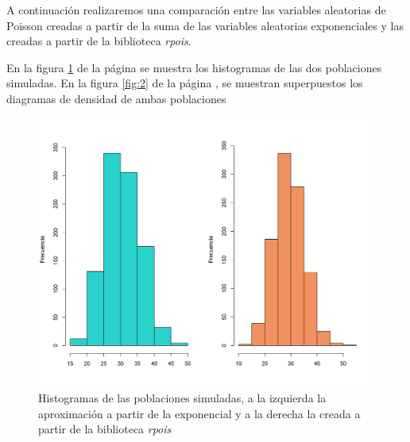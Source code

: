\documentclass{article}
\begin{document}
A continuación realizaremos una comparación entre las variables aleatorias de Poisson creadas a partir de la suma de las variables aleatorias exponenciales y las creadas a partir de la biblioteca \textit{rpois}.

En la figura \ref{fig:1} de la página \pageref{fig:1} se muestra los histogramas de las dos poblaciones simuladas. En la figura \ref{fig:2} de la página \pageref{fig:2}, se muestran superpuestos los diagramas de densidad de ambas poblaciones 

\begin{center}
\begin{figure}
\includegraphics[scale=0.65]{figuras/AproxEx30.png}
\caption{Histogramas de las poblaciones simuladas, a la izquierda la aproximación a partir de la exponencial y a la derecha la creada a partir de la biblioteca \textit{rpois}}
\label{fig:1}
\end{figure}
\end{center}
\end{document}
